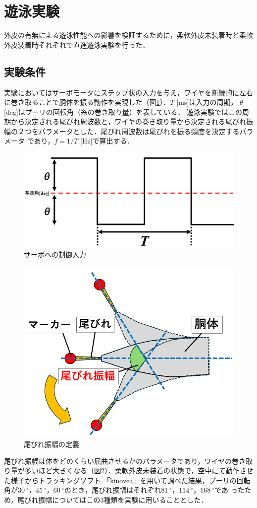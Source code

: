 \newpage
\section{遊泳実験}
外皮の有無による遊泳性能への影響を検証するために，柔軟外皮未装着時と柔軟外皮装着時それぞれで直進遊泳実験を行った．

\subsection{実験条件}
実験においてはサーボモータにステップ状の入力を与え，ワイヤを断続的に左右に巻き取ることで胴体を振る動作を実現した（図\ref{fig:servo_seigyo}）．$T$ [ms]は入力の周期，
$\theta$ [deg]はプーリの回転角（糸の巻き取り量）を表している．
遊泳実験ではこの周期から決定される尾びれ周波数と，ワイヤの巻き取り量から決定される尾びれ振幅の２つをパラメータとした．尾びれ周波数は尾びれを振る頻度を決定するパラメータ
であり，$f = 1/T$ [Hz]で算出する．
\begin{figure}[hb]
    \centering
    \includegraphics[width=0.75\linewidth]{chapters/picture/servo2.png}
    \caption{サーボへの制御入力}
    \label{fig:servo_seigyo}
\end{figure}
\begin{figure}[hb]
    \centering
    \includegraphics[width=0.6\linewidth]{chapters/picture/obire_amp.png}
    \caption{尾びれ振幅の定義}
    \label{fig:obire_amp}
\end{figure}
尾びれ振幅は体をどのくらい屈曲させるかのパラメータであり，ワイヤの巻き取り量が多いほど大きくなる（図\ref{fig:obire_amp}）．柔軟外皮未装着の状態で，空中にて動作させた様子からトラッキングソフト
「kinovea」を用いて調べた結果，プーリの回転角が$30\:^\circ$，$45\:^\circ$，$60\:^\circ$のとき，尾びれ振幅はそれぞれ$81\:^\circ$，$114\:^\circ$，$168\:^\circ$であ
ったため，尾びれ振幅についてはこの3種類を実験に用いることとした． 

